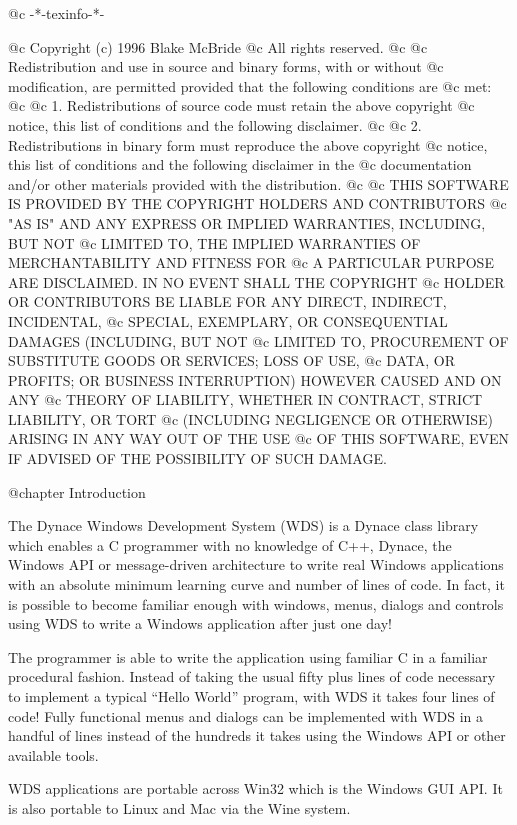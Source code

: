@c -*-texinfo-*-

@c  Copyright (c) 1996 Blake McBride
@c  All rights reserved.
@c
@c  Redistribution and use in source and binary forms, with or without
@c  modification, are permitted provided that the following conditions are
@c  met:
@c
@c  1. Redistributions of source code must retain the above copyright
@c  notice, this list of conditions and the following disclaimer.
@c
@c  2. Redistributions in binary form must reproduce the above copyright
@c  notice, this list of conditions and the following disclaimer in the
@c  documentation and/or other materials provided with the distribution.
@c
@c  THIS SOFTWARE IS PROVIDED BY THE COPYRIGHT HOLDERS AND CONTRIBUTORS
@c  "AS IS" AND ANY EXPRESS OR IMPLIED WARRANTIES, INCLUDING, BUT NOT
@c  LIMITED TO, THE IMPLIED WARRANTIES OF MERCHANTABILITY AND FITNESS FOR
@c  A PARTICULAR PURPOSE ARE DISCLAIMED. IN NO EVENT SHALL THE COPYRIGHT
@c  HOLDER OR CONTRIBUTORS BE LIABLE FOR ANY DIRECT, INDIRECT, INCIDENTAL,
@c  SPECIAL, EXEMPLARY, OR CONSEQUENTIAL DAMAGES (INCLUDING, BUT NOT
@c  LIMITED TO, PROCUREMENT OF SUBSTITUTE GOODS OR SERVICES; LOSS OF USE,
@c  DATA, OR PROFITS; OR BUSINESS INTERRUPTION) HOWEVER CAUSED AND ON ANY
@c  THEORY OF LIABILITY, WHETHER IN CONTRACT, STRICT LIABILITY, OR TORT
@c  (INCLUDING NEGLIGENCE OR OTHERWISE) ARISING IN ANY WAY OUT OF THE USE
@c  OF THIS SOFTWARE, EVEN IF ADVISED OF THE POSSIBILITY OF SUCH DAMAGE.

@chapter Introduction

The Dynace Windows Development System (WDS) is a Dynace class library
which enables a C programmer with no knowledge of C++, Dynace, the
Windows API or message-driven architecture to write real Windows
applications with an absolute minimum learning curve and number of
lines of code.  In fact, it is possible to become familiar enough with
windows, menus, dialogs and controls using WDS to write a Windows
application after just one day!

The programmer is able to write the application using familiar C in a
familiar procedural fashion.  Instead of taking the usual fifty plus
lines of code necessary to implement a typical ``Hello World'' program,
with WDS it takes four lines of code!  Fully functional menus and
dialogs can be implemented with WDS in a handful of lines instead of the
hundreds it takes using the Windows API or other available tools.

WDS applications are portable across Win32 which is the Windows GUI API.
It is also portable to Linux and Mac via the Wine system.

